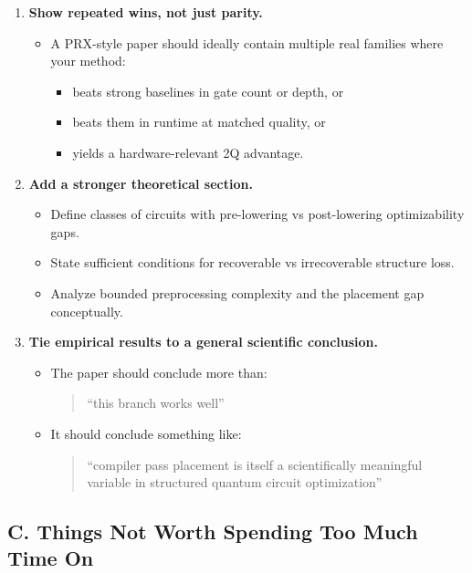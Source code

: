 \documentclass[11pt]{article}
\begin{document}
\begin{enumerate}
    \item \textbf{Show repeated wins, not just parity.}
    \begin{itemize}
        \item A PRX-style paper should ideally contain multiple real families where your method:
        \begin{itemize}
            \item beats strong baselines in gate count or depth, or
            \item beats them in runtime at matched quality, or
            \item yields a hardware-relevant 2Q advantage.
        \end{itemize}
    \end{itemize}

    \item \textbf{Add a stronger theoretical section.}
    \begin{itemize}
        \item Define classes of circuits with pre-lowering vs post-lowering optimizability gaps.
        \item State sufficient conditions for recoverable vs irrecoverable structure loss.
        \item Analyze bounded preprocessing complexity and the placement gap conceptually.
    \end{itemize}

    \item \textbf{Tie empirical results to a general scientific conclusion.}
    \begin{itemize}
        \item The paper should conclude more than:
        \begin{quote}
        ``this branch works well''
        \end{quote}
        \item It should conclude something like:
        \begin{quote}
        ``compiler pass placement is itself a scientifically meaningful variable in structured quantum circuit optimization''
        \end{quote}
    \end{itemize}
\end{enumerate}

\subsection{C. Things Not Worth Spending Too Much Time On}
\end{document}
